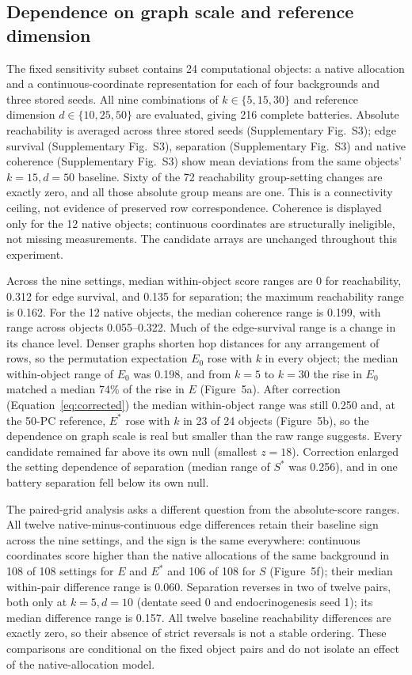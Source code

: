 \documentclass[11pt]{article}
\begin{document}
\subsection{Dependence on graph scale and reference dimension}

The fixed sensitivity subset contains 24 computational objects: a native allocation and a continuous-coordinate representation for each of four backgrounds and three stored seeds. All nine combinations of $k\in\{5,15,30\}$ and reference dimension $d\in\{10,25,50\}$ are evaluated, giving 216 complete batteries. Absolute reachability is averaged across three stored seeds (Supplementary Fig.~S3); edge survival (Supplementary Fig.~S3), separation (Supplementary Fig.~S3) and native coherence (Supplementary Fig.~S3) show mean deviations from the same objects' $k=15,d=50$ baseline. Sixty of the 72 reachability group-setting changes are exactly zero, and all those absolute group means are one. This is a connectivity ceiling, not evidence of preserved row correspondence. Coherence is displayed only for the 12 native objects; continuous coordinates are structurally ineligible, not missing measurements. The candidate arrays are unchanged throughout this experiment.



Across the nine settings, median within-object score ranges are 0 for reachability, 0.312 for edge survival, and 0.135 for separation; the maximum reachability range is 0.162. For the 12 native objects, the median coherence range is 0.199, with range across objects 0.055--0.322. Much of the edge-survival range is a change in its chance level. Denser graphs shorten hop distances for any arrangement of rows, so the permutation expectation $E_0$ rose with $k$ in every object; the median within-object range of $E_0$ was 0.198, and from $k=5$ to $k=30$ the rise in $E_0$ matched a median 74\% of the rise in $E$ (Figure~5a). After correction (Equation~\ref{eq:corrected}) the median within-object range was still 0.250 and, at the 50-PC reference, $E^*$ rose with $k$ in 23 of 24 objects (Figure~5b), so the dependence on graph scale is real but smaller than the raw range suggests. Every candidate remained far above its own null (smallest $z=18$). Correction enlarged the setting dependence of separation (median range of $S^*$ was 0.256), and in one battery separation fell below its own null.

The paired-grid analysis asks a different question from the absolute-score ranges. All twelve native-minus-continuous edge differences retain their baseline sign across the nine settings, and the sign is the same everywhere: continuous coordinates score higher than the native allocations of the same background in 108 of 108 settings for $E$ and $E^*$ and 106 of 108 for $S$ (Figure~5f); their median within-pair difference range is 0.060. Separation reverses in two of twelve pairs, both only at $k=5,d=10$ (dentate seed 0 and endocrinogenesis seed 1); its median difference range is 0.157. All twelve baseline reachability differences are exactly zero, so their absence of strict reversals is not a stable ordering. These comparisons are conditional on the fixed object pairs and do not isolate an effect of the native-allocation model.
\end{document}
